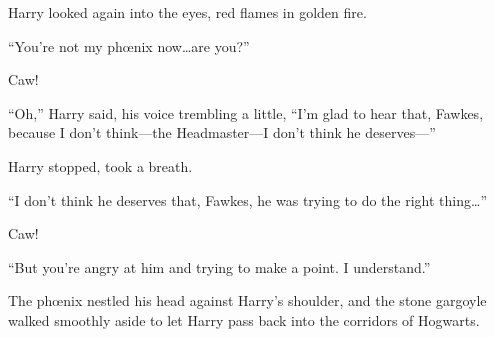 Harry looked again into the eyes, red flames in golden fire.

“You’re not my phœnix now…are you?”

Caw!

“Oh,” Harry said, his voice trembling a little, “I’m glad to hear that, Fawkes, because I don’t think—the Headmaster—I don’t think he deserves—”

Harry stopped, took a breath.

“I don’t think he deserves that, Fawkes, he was trying to do the right thing…”

Caw!

“But you’re angry at him and trying to make a point. I understand.”

The phœnix nestled his head against Harry’s shoulder, and the stone gargoyle walked smoothly aside to let Harry pass back into the corridors of Hogwarts.


